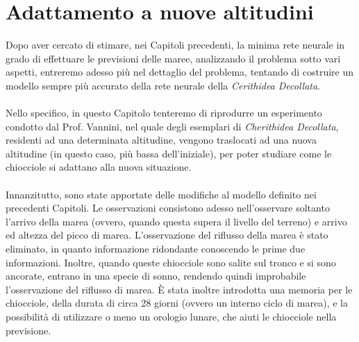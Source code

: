 \chapter{Adattamento a nuove altitudini}
	Dopo aver cercato di stimare, nei Capitoli precedenti, la minima rete neurale in grado di effettuare le previsioni delle maree, analizzando il problema sotto vari aspetti, entreremo adesso più nel dettaglio del problema, tentando di costruire un modello sempre più accurato della rete neurale della \textit{Cerithidea Decollata}.\\
	\\
	Nello specifico, in questo Capitolo tenteremo di riprodurre un esperimento condotto dal Prof. Vannini, nel quale degli esemplari di \textit{Cherithidea Decollata}, residenti ad una determinata altitudine, vengono traslocati ad una nuova altitudine (in questo caso, più bassa dell'iniziale), per poter studiare come le chiocciole si adattano alla nuova situazione.\\
	\\
	Innanzitutto, sono state apportate delle modifiche al modello definito nei precedenti Capitoli. Le osservazioni consistono adesso nell'osservare soltanto l'arrivo della marea (ovvero, quando questa supera il livello del terreno) e arrivo ed altezza del picco di marea. L'osservazione del riflusso della marea è stato eliminato, in quanto informazione ridondante conoscendo le prime due informazioni. Inoltre, quando queste chiocciole sono salite sul tronco e si sono ancorate, entrano in una specie di sonno, rendendo quindi improbabile l'osservazione del riflusso di marea. È stata inoltre introdotta una memoria per le chiocciole, della durata di circa 28 giorni (ovvero un interno ciclo di marea), e la possibilità di utilizzare o meno un orologio lunare, che aiuti le chiocciole nella previsione.\\
